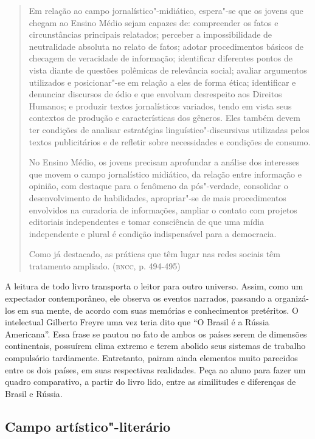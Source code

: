 \documentclass[12pt]{extarticle}
\begin{document}
\begin{quote}
Em relação ao campo jornalístico"-midiático, espera"-se que os jovens
que chegam ao Ensino Médio sejam capazes de: compreender os fatos e
circunstâncias principais relatados; perceber a impossibilidade de
neutralidade absoluta no relato de fatos; adotar procedimentos básicos
de checagem de veracidade de informação; identificar diferentes pontos
de vista diante de questões polêmicas de relevância social; avaliar
argumentos utilizados e posicionar"-se em relação a eles de forma ética;
identificar e denunciar discursos de ódio e que envolvam desrespeito aos
Direitos Humanos; e produzir textos jornalísticos variados, tendo em
vista seus contextos de produção e características dos gêneros. Eles
também devem ter condições de analisar estratégias
linguístico"-discursivas utilizadas pelos textos publicitários e de
refletir sobre necessidades e condições de consumo.

No Ensino Médio, os jovens precisam aprofundar a análise dos interesses
que movem o campo jornalístico midiático, da relação entre informação e
opinião, com destaque para o fenômeno da pós"-verdade, consolidar o
desenvolvimento de habilidades, apropriar"-se de mais procedimentos
envolvidos na curadoria de informações, ampliar o contato com projetos
editoriais independentes e tomar consciência de que uma mídia
independente e plural é condição indispensável para a democracia.

Como já destacado, as práticas que têm lugar nas redes sociais têm
tratamento ampliado. (\textsc{bncc}, p. 494-495)
\end{quote}

A leitura de todo livro transporta o leitor para outro universo.
Assim, como um expectador contemporâneo, ele observa os eventos
narrados, passando a organizá-los em sua mente, de acordo com suas
memórias e conhecimentos pretéritos. O intelectual Gilberto Freyre uma
vez teria dito que ``O Brasil é a Rússia Americana''. Essa frase se
pautou no fato de ambos os países serem de dimensões continentais,
possuírem clima extremo e terem abolido seus sistemas de trabalho
compulsório tardiamente. Entretanto, pairam ainda elementos muito
parecidos entre os dois países, em suas respectivas realidades. Peça
ao aluno para fazer um quadro comparativo, a partir do livro lido,
entre as similitudes e diferenças de Brasil e Rússia.

\subsection{Campo artístico"-literário}
\end{document}
